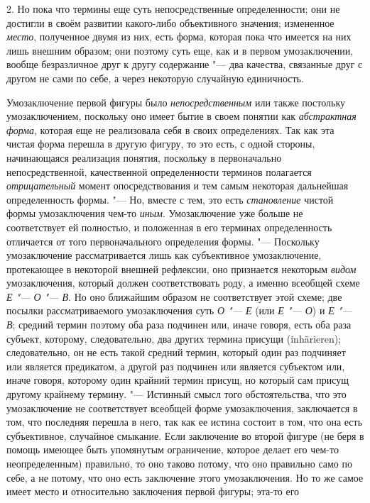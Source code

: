 {{2. Но пока что термины еще суть непосредственные
определенности; они не достигли в своём развитии какого-либо объективного
значения; измененное {\em место},
полученное двумя из них, есть форма, которая пока что имеется
на них лишь внешним образом; они поэтому суть еще, как и в
первом умозаключении, вообще безразличное друг к другу содержание
"--- два качества, связанные друг с другом не сами по себе, а
через некоторую случайную единичность.

Умозаключение первой фигуры было
{\em непосредственным}
или также постольку умозаключением, поскольку оно имеет бытие
в своем понятии как {\em абстрактная
форма}, которая еще не реализовала себя в своих
определениях. Так как эта чистая форма перешла в другую фигуру, то это
есть, с одной стороны, начинающаяся реализация понятия, поскольку в
первоначально непосредственной, качественной определенности терминов
полагается {\em отрицательный}
момент опосредствования и тем самым некоторая дальнейшая
определенность формы. "--- Но, вместе с тем, это есть
{\em становление} чистой
формы умозаключения чем-то {\em иным}.
Умозаключение уже больше не соответствует ей полностью, и
положенная в его терминах определенность отличается от того первоначального
определения формы. "--- Поскольку умозаключение рассматривается
лишь как субъективное умозаключение, протекающее в некоторой внешней
рефлексии, оно признается некоторым
{\em видом}
умозаключения, который должен соответствовать роду, а именно
всеобщей схеме {\em Е
"--- О "--- В}. Но оно ближайшим
образом не соответствует этой схеме; две посылки рассматриваемого
умозаключения суть {\em О
"--- Е} (или
{\em Е "--- О})
и {\em Е
"--- В}; средний термин поэтому оба раза подчинен
или, иначе говоря, есть оба раза субъект, которому, следовательно, два
других термина присущи (inhärieren); следовательно, он не
есть такой средний термин, который один раз подчиняет или является
предикатом, а другой раз подчинен или является субъектом или, иначе говоря,
которому один крайний термин присущ, но который сам присущ другому крайнему
термину. "--- Истинный смысл того обстоятельства, что это
умозаключение не соответствует всеобщей форме умозаключения, заключается в
том, что последняя перешла в него, так как ее истина состоит в том, что она
есть субъективное, случайное смыкание. Если заключение во второй фигуре (не
беря в помощь имеющее быть упомянутым ограничение, которое делает его
чем-то неопределенным) правильно, то оно таково потому, что оно правильно
само по себе, а не потому, что оно есть заключение этого умозаключения. Но
то же самое имеет место и относительно заключения первой фигуры; эта-то его
}}
